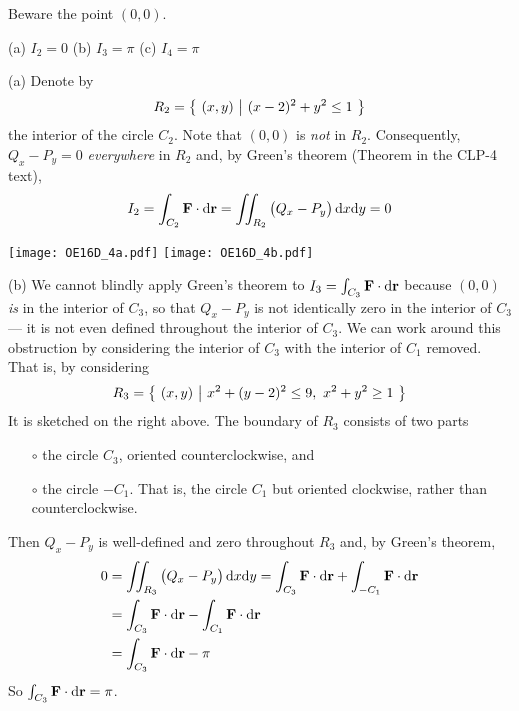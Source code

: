 \begin{hint} 
Beware the point $(0,0)$.
\end{hint}

\begin{answer} 
(a) $I_2=0$\qquad
(b) $I_3=\pi$\qquad
(c) $I_4=\pi$
\end{answer}

\begin{solution} (a) Denote by
\begin{equation*}
R_2=\big\{ \ (x,y)\ \big|\  (x-2)^2+y^2\le 1\ \big\}
\end{equation*}
the interior of the circle $C_2$. Note that $(0,0)$ is \emph{not}
in $R_2$. Consequently, $Q_x-P_y=0$ \emph{everywhere} in $R_2$ and,
by Green's theorem (Theorem  in the CLP-4 text),
\begin{equation*}
I_2 = \int_{C_2} \mathbf{F}\cdot\mathrm{d}\mathbf{r}
    =\iint_{R_2} \big(Q_x-P_y\big)\,\mathrm{d}x\mathrm{d}y
    =0
\end{equation*}

\begin{center}
     \texttt{[image: OE16D\_4a.pdf]}\qquad
     \texttt{[image: OE16D\_4b.pdf]}\qquad
\end{center}

(b) We cannot blindly apply Green's theorem to $I_3=\int_{C_3}\mathbf{F}\cdot\mathrm{d}\mathbf{r}$
because $(0,0)$ \emph{is} in the interior of $C_3$, so that 
$Q_x-P_y$ is not identically zero in the interior of $C_3$ --- it is not
even defined throughout the interior of $C_3$. We can work around this obstruction by considering the interior of $C_3$ with the interior of $C_1$
removed. That is, by considering
\begin{equation*}
R_3 = \big\{ \ (x,y)\ \big|\ x^2 + (y - 2)^2 \le 9,\ x^2+y^2\ge 1\ \big\}
\end{equation*}
It is sketched on the right above.
The boundary of $R_3$ consists of two parts
\begin{itemize}\itemsep1pt \parskip0pt  %
\item[$\circ$]
the circle $C_3$, oriented counterclockwise, and
\item[$\circ$]
the circle $-C_1$. That is, the circle $C_1$ but oriented clockwise,
rather than counterclockwise.
\end{itemize}
Then $Q_x-P_y$ is well-defined and zero throughout $R_3$ and,
by Green's theorem,
\begin{align*}
   0 &=\iint_{R_3} \big(Q_x-P_y\big)\,\mathrm{d}x\mathrm{d}y 
     = \int_{C_3} \mathbf{F}\cdot\mathrm{d}\mathbf{r} 
             + \int_{-C_1} \mathbf{F}\cdot\mathrm{d}\mathbf{r} \\
    &= \int_{C_3} \mathbf{F}\cdot\mathrm{d}\mathbf{r} 
             - \int_{C_1} \mathbf{F}\cdot\mathrm{d}\mathbf{r} \\
    &= \int_{C_3} \mathbf{F}\cdot\mathrm{d}\mathbf{r} 
             - \pi 
\end{align*}
So $\int_{C_3} \mathbf{F}\cdot\mathrm{d}\mathbf{r} = \pi$.


\end{solution}
